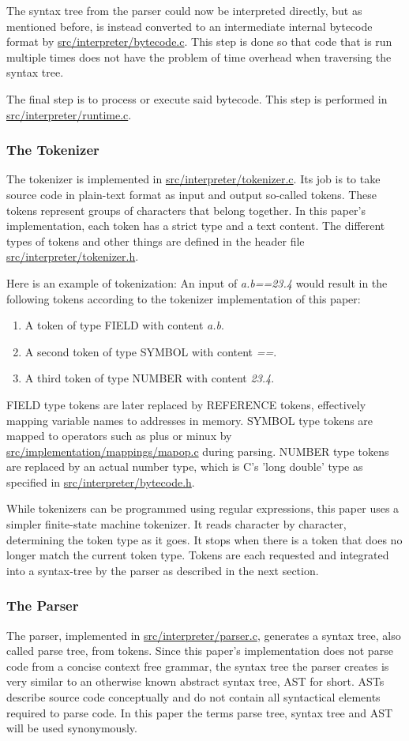 \documentclass[12pt,a4paper]{article}
\newcommand{\hrc}[1]{\hyperref[#1]{#1}}
\begin{document}
The syntax tree from the parser could now be interpreted directly, but as mentioned 
before, is instead converted
to an intermediate internal bytecode format by \hrc{src/interpreter/bytecode.c}.
This step is done so that code that is run multiple times does not have
the problem of time overhead when traversing the syntax tree.

The final step is to process or execute said bytecode. This step is performed
in \hrc{src/interpreter/runtime.c}.

\subsubsection{The Tokenizer}
The tokenizer is implemented in \hrc{src/interpreter/tokenizer.c}. Its job is to
take source code in plain-text format as input and output so-called tokens.
These tokens represent groups of characters that belong together. In this paper's
implementation, each token has a strict type and a text content.
The different types of tokens and other things are defined in the header file
\hrc{src/interpreter/tokenizer.h}.

Here is an example of tokenization:
An input of \emph{a.b==23.4} would result in the following tokens according
to the tokenizer implementation of this paper:
\begin{enumerate}
    \item A token of type FIELD with content \emph{a.b}.
    \item A second token of type SYMBOL with content \emph{==}.
    \item A third token of type NUMBER with content \emph{23.4}.
\end{enumerate}
FIELD type tokens are later replaced by REFERENCE tokens, effectively mapping
variable names to addresses in memory.
SYMBOL type tokens are mapped to operators such as plus or minux by \hrc{src/implementation/mappings/mapop.c}
during parsing. NUMBER type tokens are replaced by an actual number type, which
is C's 'long double' type as specified in \hrc{src/interpreter/bytecode.h}.

While tokenizers can be programmed using regular expressions, 
this paper uses a simpler finite-state machine tokenizer.
It reads character by character, determining the token type as it goes.
It stops when there is a token that does no longer match the current token type.
Tokens are each requested and integrated into a syntax-tree by the parser as described in the next
section.

\subsubsection{The Parser}
The parser, implemented in \hrc{src/interpreter/parser.c}, generates a syntax tree,
also called parse tree, from tokens. Since this paper's implementation 
does not parse code from a
concise context free grammar, the syntax tree the parser creates is very
similar to an otherwise known abstract syntax tree, AST for short.
ASTs describe source code conceptually and do not contain all syntactical
elements required to parse code.
In this paper the terms parse tree, syntax tree and AST will be used
synonymously.
\end{document}
